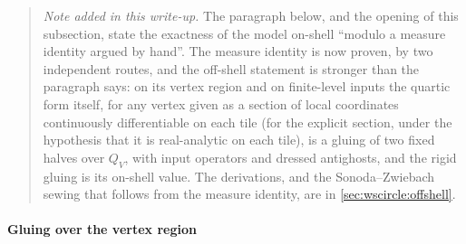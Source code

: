 \begin{quote}
  \small
  \emph{Note added in this write-up.}
  The paragraph below, and the opening of this subsection, state the exactness of the model on-shell ``modulo a measure identity argued by hand''.
  The measure identity is now proven, by two independent routes, and the off-shell statement is stronger than the paragraph says: on its vertex region and on finite-level inputs the quartic form itself, for any vertex given as a section of local coordinates continuously differentiable on each tile (for the explicit section, under the hypothesis that it is real-analytic on each tile), is a gluing of two fixed halves over $Q_V$, with input operators and dressed antighosts, and the rigid gluing is its on-shell value.
  The derivations, and the Sonoda--Zwiebach sewing that follows from the measure identity, are in \cref{sec:wscircle:offshell}.
\end{quote}

\paragraph{Gluing over the vertex region}
\label{p:sec:ws:gluing}

